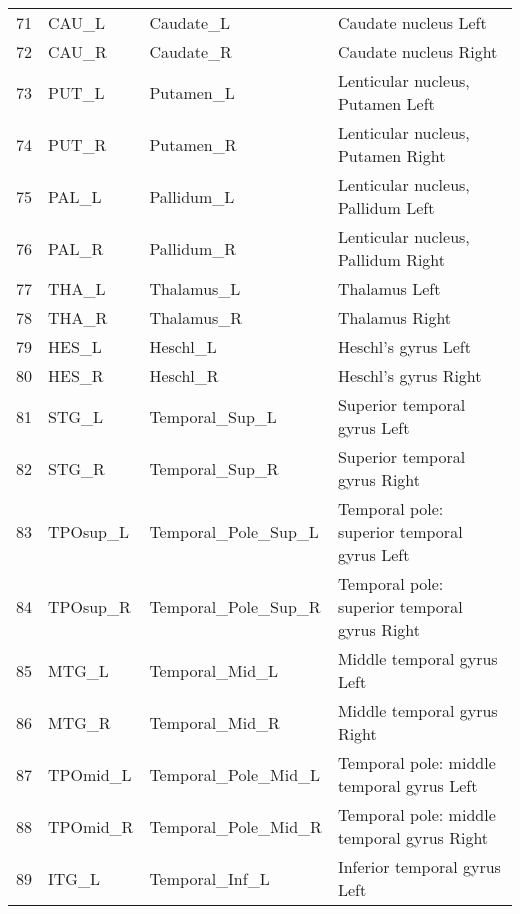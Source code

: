 \documentclass[12pt,reqno]{amsart}
\theoremstyle{definition}
\begin{document}
\begin{longtable}{rlll}
 71 &       CAU\_L &            Caudate\_L &                               Caudate nucleus Left \\
 72 &       CAU\_R &            Caudate\_R &                              Caudate nucleus Right \\
 73 &       PUT\_L &            Putamen\_L &                   Lenticular nucleus, Putamen Left \\
 74 &       PUT\_R &            Putamen\_R &                  Lenticular nucleus, Putamen Right \\
 75 &       PAL\_L &           Pallidum\_L &                  Lenticular nucleus, Pallidum Left \\
 76 &       PAL\_R &           Pallidum\_R &                 Lenticular nucleus, Pallidum Right \\
 77 &       THA\_L &           Thalamus\_L &                                      Thalamus Left \\
 78 &       THA\_R &           Thalamus\_R &                                     Thalamus Right \\
 79 &       HES\_L &             Heschl\_L &                                Heschl's gyrus Left \\
 80 &       HES\_R &             Heschl\_R &                               Heschl's gyrus Right \\
 81 &       STG\_L &       Temporal\_Sup\_L &                       Superior temporal gyrus Left \\
 82 &       STG\_R &       Temporal\_Sup\_R &                      Superior temporal gyrus Right \\
 83 &    TPOsup\_L &  Temporal\_Pole\_Sup\_L &        Temporal pole: superior temporal gyrus Left \\
 84 &    TPOsup\_R &  Temporal\_Pole\_Sup\_R &       Temporal pole: superior temporal gyrus Right \\
 85 &       MTG\_L &       Temporal\_Mid\_L &                         Middle temporal gyrus Left \\
 86 &       MTG\_R &       Temporal\_Mid\_R &                        Middle temporal gyrus Right \\
 87 &    TPOmid\_L &  Temporal\_Pole\_Mid\_L &          Temporal pole: middle temporal gyrus Left \\
 88 &    TPOmid\_R &  Temporal\_Pole\_Mid\_R &         Temporal pole: middle temporal gyrus Right \\
 89 &       ITG\_L &       Temporal\_Inf\_L &                       Inferior temporal gyrus Left \\

\end{longtable}
\end{document}
